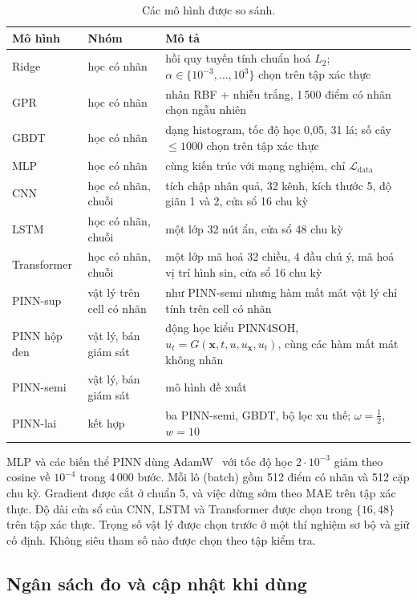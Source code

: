 \begin{table}[!htbp]\centering\small
\caption{Các mô hình được so sánh.}\label{tab:models}
\begin{tabularx}{\textwidth}{l>{\raggedright}p{3.2cm}>{\raggedright\arraybackslash}X}
\toprule
Mô hình & Nhóm & Mô tả \\
\midrule
Ridge & học có nhãn & hồi quy tuyến tính chuẩn hoá $L_2$; $\alpha \in \{10^{-3},\dots,10^{3}\}$ chọn trên tập xác thực\\
GPR & học có nhãn & nhân RBF + nhiễu trắng, 1\,500 điểm có nhãn chọn ngẫu nhiên\\
GBDT & học có nhãn & dạng histogram, tốc độ học 0,05, 31 lá; số cây $\le 1000$ chọn trên tập xác thực\\
MLP & học có nhãn & cùng kiến trúc với mạng nghiệm, chỉ $\mathcal{L}_\text{data}$\\
CNN & học có nhãn, chuỗi & tích chập nhân quả, 32 kênh, kích thước 5, độ giãn 1 và 2, cửa sổ 16 chu kỳ\\
LSTM & học có nhãn, chuỗi & một lớp 32 nút ẩn, cửa sổ 48 chu kỳ\\
Transformer & học có nhãn, chuỗi & một lớp mã hoá 32 chiều, 4 đầu chú ý, mã hoá vị trí hình sin, cửa sổ 16 chu kỳ\\
PINN-sup & vật lý trên cell có nhãn & như PINN-semi nhưng hàm mất mát vật lý chỉ tính trên cell có nhãn\\
PINN hộp đen & vật lý, bán giám sát & động học kiểu PINN4SOH, $u_t = G(\mathbf{x}, t, u, u_\mathbf{x}, u_t)$, cùng các hàm
mất mát không nhãn\\
PINN-semi & vật lý, bán giám sát & mô hình đề xuất\\
PINN-lai & kết hợp & ba PINN-semi, GBDT, bộ lọc xu thế; $\omega = \tfrac12$, $w = 10$\\
\bottomrule
\end{tabularx}
\end{table}

MLP và các biến thể PINN dùng AdamW~\cite{loshchilov2019} với tốc độ học $2\cdot10^{-3}$ giảm theo cosine về $10^{-4}$
trong 4\,000 bước. Mỗi lô (batch) gồm 512 điểm có nhãn và 512 cặp chu kỳ. Gradient được cắt ở chuẩn 5, và việc dừng sớm
theo MAE trên tập xác thực. Độ dài cửa sổ của CNN, LSTM và Transformer được chọn trong $\{16, 48\}$ trên tập xác thực.
Trọng số vật lý được chọn trước ở một thí nghiệm sơ bộ và giữ cố định. Không siêu tham số nào được chọn theo tập kiểm tra.

\subsection{Ngân sách đo và cập nhật khi dùng}\label{sec:mo_rong}

